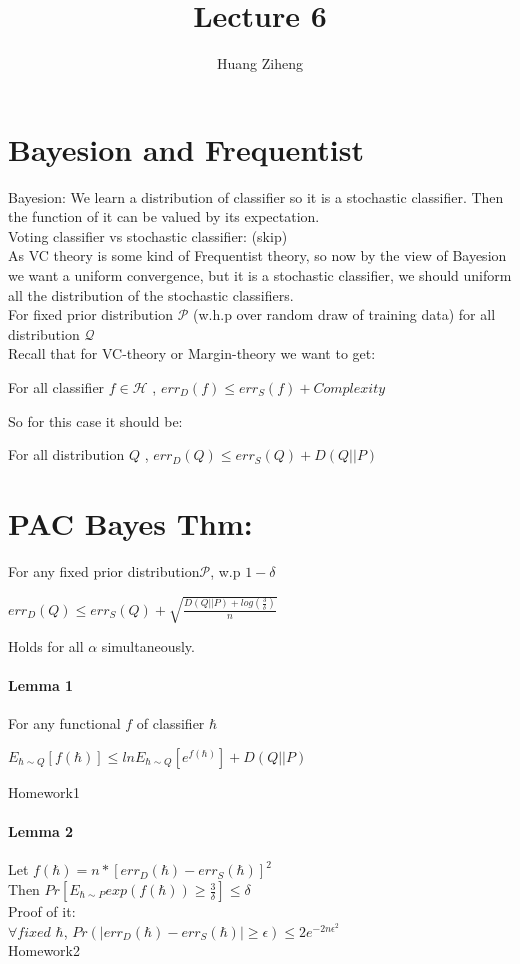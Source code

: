 \documentclass{article}
\author{Huang Ziheng}
\title{Lecture 6}
\begin{document}
\maketitle
\section{Bayesion and Frequentist}
Bayesion: We learn a distribution of classifier so it is a stochastic classifier. Then the function of it can be valued by its expectation.
\\Voting classifier vs stochastic classifier: (skip)
\\As VC theory is some kind of Frequentist theory, so now by the view of Bayesion we want a uniform convergence, but it is a stochastic classifier, we should uniform all the distribution of the stochastic classifiers.
\\For fixed prior distribution $\mathcal{P}$ (w.h.p over random draw of training data) for all distribution $\mathcal{Q}$
\\Recall that for VC-theory or Margin-theory we want to get:
\begin{center}
For all classifier $f\in\mathcal{H}$ , $err_D(f)\leq err_S(f)+Complexity$
\end{center}
So for this case it should be:
\begin{center}
For all distribution $Q$ , $err_D(Q)\leq err_S(Q)+D(Q||P)$
\end{center}

\section{PAC Bayes Thm:}
For any fixed prior distribution$\mathcal{P}$, w.p $1-\delta$
\begin{center}
$err_D(Q)\leq err_S(Q)+\sqrt{\frac{D(Q||P)+log(\frac{3}{\delta})}{n}}$
\end{center}
Holds for all $\alpha$ simultaneously.
\paragraph{Lemma 1}
For any functional $f$ of classifier $\hbar$
\begin{center}
$E_{\hbar\sim Q}[f(\hbar)]\leq ln E_{\hbar\sim Q}[e^{f(\hbar)}]+D(Q||P)$
\end{center}
Homework1
\paragraph{Lemma 2}
Let $f(\hbar)=n*[err_D(\hbar)-err_S(\hbar)]^2$
\\Then $Pr[E_{\hbar\sim P}exp(f(\hbar))\geq\frac{3}{\delta}]\leq\delta$
\\Proof of it:
\\$\forall fixed$ $\hbar$, $Pr(|err_D(\hbar)-err_S(\hbar)|\geq\epsilon)\leq 2e^{-2n\epsilon^2}$
\\Homework2
\end{document}
